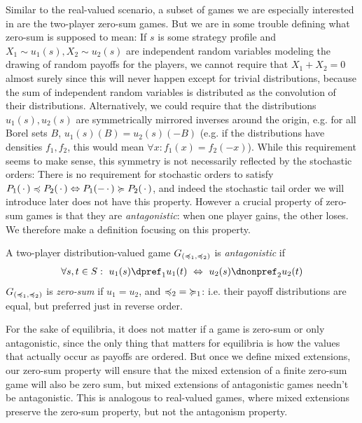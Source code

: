 \documentclass[a4paper]{scrreprt}
\begin{document}
    Similar to the real-valued scenario, a subset of games we are especially interested in are the two-player zero-sum games.
    But we are in some trouble defining what zero-sum is supposed to mean: If $s$ is some strategy profile and $X_1 \sim u_1(s), X_2 \sim u_2(s)$ are independent random variables modeling the drawing of random payoffs for the players, we cannot require that $X_1 + X_2 = 0$ almost surely since this will never happen except for trivial distributions, because the sum of independent random variables is distributed as the convolution of their distributions.
    Alternatively, we could require that the distributions $u_1(s), u_2(s)$ are symmetrically mirrored inverses around the origin, e.g. for all Borel sets $B$, $u_1(s)(B) = u_2(s)(-B)$ (e.g. 
    if the distributions have densities $f_1, f_2$, this would mean $\forall x: f_1(x) = f_2(-x)$).
    While this requirement seems to make sense, this symmetry is not necessarily reflected by the stochastic orders: There is no requirement for stochastic orders to satisfy $P_1(\,\cdot\,) \preccurlyeq P_2(\,\cdot\,) \Leftrightarrow P_1(-\,\cdot\,) \succcurlyeq P_2(\,\cdot\,)$, and indeed the stochastic tail order we will introduce later does not have this property.
    However a crucial property of zero-sum games is that they are \emph{antagonistic}: 
    when one player gains, the other loses. We therefore make a definition focusing on this property.
    \begin{defn}
        A two-player distribution-valued game $G_{(\preccurlyeq_1, \preccurlyeq_2)}$ is \emph{antagonistic} if
        \begin{gather*}
            \forall s, t \in S:~ u_1(s) \dpref_1 u_1(t) ~\lra~ u_2(s) \dnonpref_2 u_2(t)
        \end{gather*}
        $G_{(\preccurlyeq_1, \preccurlyeq_2)}$ is \emph{zero-sum} if $u_1 = u_2$, and $\preccurlyeq_2 {=} \succcurlyeq_1$: i.e. their payoff distributions are equal, but preferred just in reverse order.
    \end{defn}

    For the sake of equilibria, it does not matter if a game is zero-sum or only antagonistic, since the only thing that matters for equilibria is how the values that actually occur as payoffs are ordered. But once we define mixed extensions, our zero-sum property will ensure that the mixed extension of a finite zero-sum game will also be zero sum, but mixed extensions of antagonistic games needn't be antagonistic. This is analogous to real-valued games, where mixed extensions preserve the zero-sum property, but not the antagonism property.
    
\end{document}
